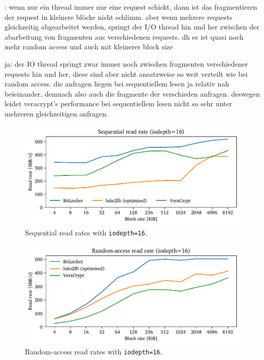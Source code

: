 : wenn nur ein thread immer nur eine request schickt, dann ist das fragmentieren der request in kleinere blöcke nicht schlimm. aber wenn mehrere requests gleichzeitig abgearbeitet werden, springt der I/O thread hin und her zwischen der abarbeitung von fragmenten aus verschiedenen requests. dh es ist quasi noch mehr random access und auch mit kleinerer block size

 ja: der IO thread springt zwar immer noch zwischen fragmenten verschiedener requests hin und her, diese sind aber nicht ansatzweise so weit verteilt wie bei random access. die anfragen liegen bei sequentiellem lesen ja relativ nah beieinander, demnach also auch die fragmente der verschieden anfragen. deswegen leidet veracrypt's performance bei sequentiellem lesen nicht so sehr unter mehreren gleichzeitigen anfragen.

\begin{figure}[htb!]
	\center
	\includegraphics[scale=1]{../fig/performance.hwexperiments.optseqqueue.pdf}
	\caption[
		Sequential read rates with \texttt{iodepth=16}
	]{
		Sequential read rates with \texttt{iodepth=16}. 
	}
	\label{fig:performance.hwexperiments.optseqqueue}
\end{figure}

\begin{figure}[htb!]
	\center
	\includegraphics[scale=1]{../fig/performance.hwexperiments.optrandqueue.pdf}
	\caption[
		Random-access read rates with \texttt{iodepth=16}
	]{
		Random-access read rates with \texttt{iodepth=16}. 
	}
	\label{fig:performance.hwexperiments.optrandqueue}
\end{figure}

